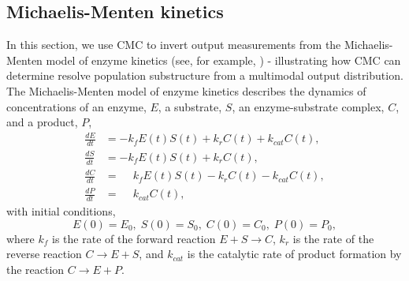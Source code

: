 \subsection{Michaelis-Menten kinetics}
In this section, we use CMC to invert output measurements from the Michaelis-Menten model of enzyme kinetics (see, for example, \cite{murray2007mathematical}) - illustrating how CMC can determine resolve population substructure from a multimodal output distribution. The Michaelis-Menten model of enzyme kinetics describes the dynamics of concentrations of an enzyme, $E$, a substrate, $S$, an enzyme-substrate complex, $C$, and a product, $P$,
%
\begin{equation}\label{eq:michaelis_menten}
\begin{aligned}
\frac{dE}{dt} &= -k_f E(t)S(t) + k_r C(t) + k_{cat} C(t), \\
\frac{dS}{dt} &= -k_f E(t)S(t) + k_r C(t), \\
\frac{dC}{dt} &= \phantom{-}k_f E(t)S(t) - k_r C(t) - k_{cat} C(t), \\
\frac{dP}{dt} &= \phantom{-}k_{cat} C(t),
\end{aligned}
\end{equation}
%
with initial conditions,
\begin{equation}
E(0) = E_0, \; S(0)=S_0, \; C(0)=C_0, \; P(0)=P_0,
\end{equation}
%
where $k_f$ is the rate of the forward reaction $E+S \rightarrow C$, $k_r$ is the rate of the reverse reaction $C \rightarrow E+S$, and $k_{cat}$ is the catalytic rate of product formation by the reaction $C \rightarrow E + P$.


